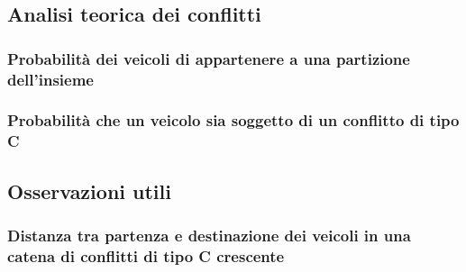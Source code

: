 \documentclass[../../relazione.tex]{subfiles}
\begin{document}
\subsection{Analisi teorica dei conflitti}
\subsubsection{Probabilità dei veicoli di appartenere a una partizione dell'insieme}

\subsubsection{Probabilità che un veicolo sia soggetto di un conflitto di tipo C}


\subsection{Osservazioni utili}
\subsubsection{Distanza tra partenza e destinazione dei veicoli in una catena di conflitti di tipo C crescente}
\end{document}
